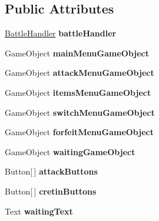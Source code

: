 \subsection*{Public Attributes}
\begin{DoxyCompactItemize}
\item 
\hypertarget{group__client_ga1b3ecd57ac7d9161ea56b8942003a2b5}{\hyperlink{class_battle_handler}{Battle\-Handler} {\bfseries battle\-Handler}}\label{group__client_ga1b3ecd57ac7d9161ea56b8942003a2b5}

\item 
\hypertarget{group__client_gab272bc3fa2feae7a46ee866a5252d47b}{Game\-Object {\bfseries main\-Menu\-Game\-Object}}\label{group__client_gab272bc3fa2feae7a46ee866a5252d47b}

\item 
\hypertarget{group__client_ga0c493074ee8edeaaeafd6be0792f1b8e}{Game\-Object {\bfseries attack\-Menu\-Game\-Object}}\label{group__client_ga0c493074ee8edeaaeafd6be0792f1b8e}

\item 
\hypertarget{group__client_gaf99e8408c55ed31be12051692750cb97}{Game\-Object {\bfseries items\-Menu\-Game\-Object}}\label{group__client_gaf99e8408c55ed31be12051692750cb97}

\item 
\hypertarget{group__client_ga980ceadc6a8df5e2993b6fc97dc89083}{Game\-Object {\bfseries switch\-Menu\-Game\-Object}}\label{group__client_ga980ceadc6a8df5e2993b6fc97dc89083}

\item 
\hypertarget{group__client_gaf29f6bee62095208f55a9d3fee5a628c}{Game\-Object {\bfseries forfeit\-Menu\-Game\-Object}}\label{group__client_gaf29f6bee62095208f55a9d3fee5a628c}

\item 
\hypertarget{group__client_gad6f40ffcec5911934218836218995e41}{Game\-Object {\bfseries waiting\-Game\-Object}}\label{group__client_gad6f40ffcec5911934218836218995e41}

\item 
\hypertarget{group__client_ga57dc6e1b53d2412dd00eb29859bac337}{Button\mbox{[}$\,$\mbox{]} {\bfseries attack\-Buttons}}\label{group__client_ga57dc6e1b53d2412dd00eb29859bac337}

\item 
\hypertarget{group__client_ga188d6c1d20ceab7503469b77818cb7fc}{Button\mbox{[}$\,$\mbox{]} {\bfseries cretin\-Buttons}}\label{group__client_ga188d6c1d20ceab7503469b77818cb7fc}

\item 
\hypertarget{group__client_ga2f5cb0c646d3675c7c7805381d7e54d2}{Text {\bfseries waiting\-Text}}\label{group__client_ga2f5cb0c646d3675c7c7805381d7e54d2}

\end{DoxyCompactItemize}
